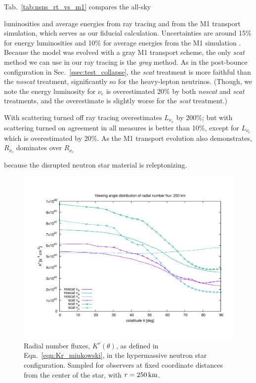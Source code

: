 \documentclass[aps,floatfix,prd,superscriptaddress,twocolumn]{revtex4-1}
\newcommand{\todo}[1]{\marginpar{\tiny{\textcolor{red}{#1}}}}
\renewcommand\todo[1]{} %
\begin{document}
Tab.~\ref{tab:nsns_rt_vs_m1} compares the all-sky
\todo{get accurate M1 numbers from Francois}
luminosities and average energies from ray tracing and from
the M1 transport simulation,
which serves as our fiducial calculation.
Uncertainties are around 15\% for energy luminosities and
10\% for average energies from the M1 simulation
\cite[Sec.~A.6]{fouc2016-m1_evolve_n}.
Because the model was evolved with a gray M1 transport scheme,
the only \emph{scat} method we can use in our ray tracing is the
\emph{gray} method.
As in the post-bounce configuration in Sec.~\ref{ssec:test_collapse},
the \emph{scat} treatment is more faithful than the \emph{noscat} treatment,
significantly so for the heavy-lepton neutrinos.
(Though, we note the energy luminosity for $\nu_e$ is overestimated
20\% by both \emph{noscat} and \emph{scat} treatments,
and the overestimate is slightly worse for the \emph{scat} treatment.)
\todo{explain}
With scattering turned off ray tracing overestimates $L_{\nu_x}$ by 200\%;
but with scattering turned on agreement in all measures
is better than 10\%, except for $L_{\nu_e}$ which is overestimated by 20\%.
As the M1 transport evolution also demonstrates,
$R_{\bar{\nu}_e}$ dominates over $R_{\nu_e}$
\todo{Need $R$ magnitude not just difference}
because the disrupted neutron star material is releptonizing.

\begin{figure}
  \includegraphics[width=\columnwidth]{theta_distrib-250km-Kr}
  \caption{Radial number fluxes, $K^r(\theta)$,
    as defined in Eqn.~\ref{eqn:Kr_minkowski},
    in the hypermassive neutron star configuration.
    Sampled for observers at fixed coordinate distances from the center
    of the star, with $r=250\,{\rm km}$.
  }
  \label{fig:nsns_theta_distrib_Kr}
\end{figure}
\end{document}
